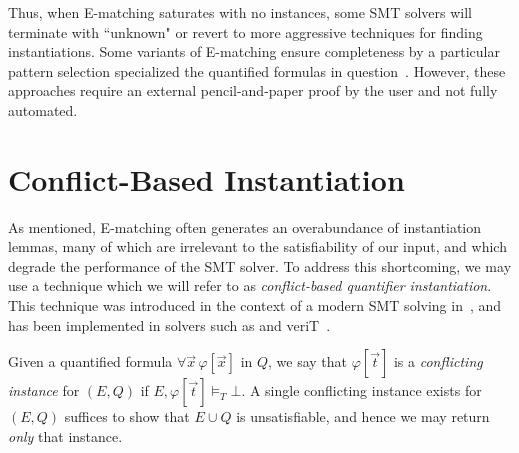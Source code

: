 \documentclass[oribibl]{llncs}
\begin{document}
Thus, when E-matching saturates with no instances, some SMT solvers will terminate with ``unknown"
or revert to more aggressive techniques for finding instantiations.
Some variants of E-matching ensure completeness by a particular pattern selection specialized the quantified formulas in question~\cite{dross2016adding,bansaldeciding}.
However, these approaches require an external pencil-and-paper proof by the user and not fully automated.

\section{Conflict-Based Instantiation}
\label{sec:cbqi}

As mentioned, E-matching often generates an overabundance of instantiation lemmas, 
many of which are irrelevant to the satisfiability of our input,
and which degrade the performance of the SMT solver.
To address this shortcoming, we may use a technique which we will refer to as \emph{conflict-based quantifier instantiation}.
This technique was introduced in the context of a modern SMT solving in~\cite{ReynoldsTinelliMoura14}, 
and has been implemented in solvers such as \cvc and veriT~\cite{DBLP:conf/cade/Barbosa16}.

Given a quantified formula $\forall \vec x\, \varphi[ \vec x ]$ in $Q$,
we say that $\varphi[ \vec t ]$ is a \emph{conflicting instance} for $( E, Q )$ if $E, \varphi[ \vec t ] \models_T \bot$.
A single conflicting instance exists for $(E, Q )$ suffices to show that $E \cup Q$ is unsatisfiable,
and hence we may return \emph{only} that instance.
\end{document}

